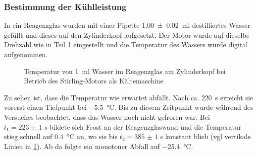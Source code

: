 \subsubsection{Bestimmung der Kühlleistung}
In ein Reagenzglas wurden mit einer Pipette \SI{1.00(2)}{ml} destilliertes Wasser gefüllt und dieses auf den Zylinderkopf aufgesetzt. Der Motor wurde auf dieselbe Drehzahl wie in Teil 1 eingestellt und die Temperatur des Wassers wurde digital aufgenommen.
\begin{figure}[h!]
\centering
{}
\caption{Temperatur von \SI{1}{ml} Wasser im Reagenzglas am Zylinderkopf bei Betrieb des Stirling-Motors als Kältemaschine}
\label{fig:kaeltemaschine}
\end{figure}

Zu sehen ist, dass die Temperatur wie erwartet abfällt. Nach ca. \SI{220}{s} erreicht sie vorerst einen Tiefpunkt bei \SI{-5.5}{\degreeCelsius}. Bis zu diesem Zeitpunkt wurde während des Versuches beobachtet, dass das Wasser noch nicht gefroren war. Bei $t_1=\SI{223(1)}{s}$ bildete sich Frost an der Reagenzglaswand und die Temperatur stieg schnell auf \SI{0.4}{\degreeCelsius} an, wo sie bis $t_2=\SI{385(1)}{s}$ konstant blieb (vgl vertikale Linien in \cref{fig:kaeltemaschine}). Ab da folgte ein monotoner Abfall auf \SI{-25.4}{\degreeCelsius}.

